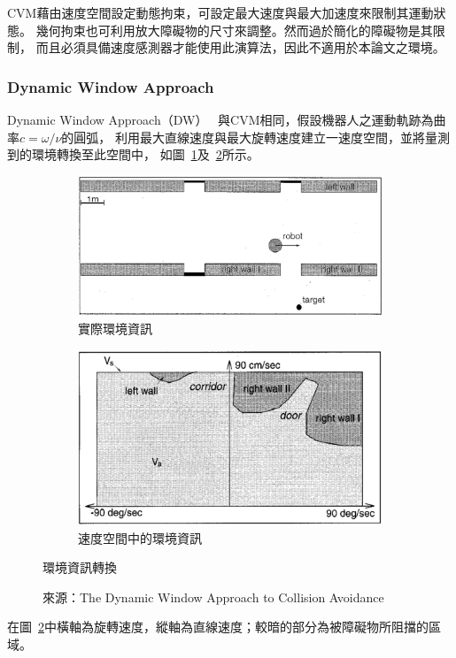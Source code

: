 CVM藉由速度空間設定動態拘束，可設定最大速度與最大加速度來限制其運動狀態。
幾何拘束也可利用放大障礙物的尺寸來調整。然而過於簡化的障礙物是其限制，
而且必須具備速度感測器才能使用此演算法，因此不適用於本論文之環境。

\subsubsection{Dynamic Window Approach}
Dynamic Window Approach（DW）~\cite{Thrun:1997:DW}
與CVM相同，假設機器人之運動軌跡為曲率$c=\omega/\nu$的圓弧，
利用最大直線速度與最大旋轉速度建立一速度空間，並將量測到的環境轉換至此空間中，
如圖~\ref{f:DW_cartesian}及~\ref{f:DW_velocity}所示。
\begin{figure}[h!]
	\centering
	\begin{subfigure}[t]{0.6\textwidth}
		\includegraphics[width=\textwidth]{figures/algorithm/DW_cartesian}
		\caption{實際環境資訊}
		\label{f:DW_cartesian}
	\end{subfigure}
	\begin{subfigure}[t]{0.6\textwidth}
		\includegraphics[width=\textwidth]{figures/algorithm/DW_velocity}
		\caption{速度空間中的環境資訊}
		\label{f:DW_velocity}
	\end{subfigure}
	\caption{環境資訊轉換}
	\caption*{來源：The Dynamic Window Approach to Collision Avoidance}
	\label{f:v_space}
\end{figure}
在圖~\ref{f:DW_velocity}中橫軸為旋轉速度，縱軸為直線速度；較暗的部分為被障礙物所阻擋的區域。

